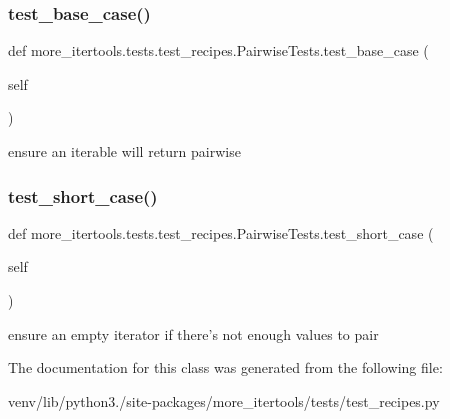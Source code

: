 \subsubsection{\texorpdfstring{test\+\_\+base\+\_\+case()}{test\_base\_case()}}
{\footnotesize\ttfamily def more\+\_\+itertools.\+tests.\+test\+\_\+recipes.\+Pairwise\+Tests.\+test\+\_\+base\+\_\+case (\begin{DoxyParamCaption}\item[{}]{self }\end{DoxyParamCaption})}

\begin{DoxyVerb}ensure an iterable will return pairwise\end{DoxyVerb}
 \mbox{\label{classmore__itertools_1_1tests_1_1test__recipes_1_1_pairwise_tests_a75c819573ac92a134ec8256961e6f667}} 
\subsubsection{\texorpdfstring{test\+\_\+short\+\_\+case()}{test\_short\_case()}}
{\footnotesize\ttfamily def more\+\_\+itertools.\+tests.\+test\+\_\+recipes.\+Pairwise\+Tests.\+test\+\_\+short\+\_\+case (\begin{DoxyParamCaption}\item[{}]{self }\end{DoxyParamCaption})}

\begin{DoxyVerb}ensure an empty iterator if there's not enough values to pair\end{DoxyVerb}
 

The documentation for this class was generated from the following file\+:\begin{DoxyCompactItemize}
\item 
venv/lib/python3./site-\/packages/more\+\_\+itertools/tests/test\+\_\+recipes.\+py\end{DoxyCompactItemize}

